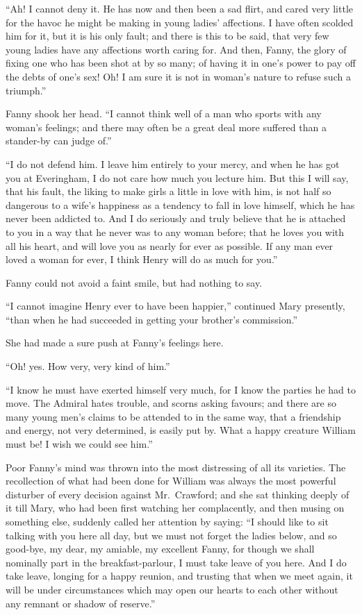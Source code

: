 \documentclass{article}
\begin{document}
``Ah!  I cannot deny it.  He has now and then been a sad flirt,
and cared very little for the havoc he might be making in
young ladies' affections.  I have often scolded him for it,
but it is his only fault; and there is this to be said,
that very few young ladies have any affections worth
caring for.  And then, Fanny, the glory of fixing one
who has been shot at by so many; of having it in one's
power to pay off the debts of one's sex!  Oh!  I am sure
it is not in woman's nature to refuse such a triumph.''

Fanny shook her head.  ``I cannot think well of a man
who sports with any woman's feelings; and there may often
be a great deal more suffered than a stander-by can judge of.''

``I do not defend him.  I leave him entirely to your mercy,
and when he has got you at Everingham, I do not care how much
you lecture him.  But this I will say, that his fault,
the liking to make girls a little in love with him, is not
half so dangerous to a wife's happiness as a tendency to fall
in love himself, which he has never been addicted to.
And I do seriously and truly believe that he is attached
to you in a way that he never was to any woman before;
that he loves you with all his heart, and will love you
as nearly for ever as possible.  If any man ever loved
a woman for ever, I think Henry will do as much for you.''

Fanny could not avoid a faint smile, but had nothing
to say.

``I cannot imagine Henry ever to have been happier,''
continued Mary presently, ``than when he had succeeded
in getting your brother's commission.''

She had made a sure push at Fanny's feelings here.

``Oh! yes.  How very, very kind of him.''

``I know he must have exerted himself very much, for I know
the parties he had to move.  The Admiral hates trouble,
and scorns asking favours; and there are so many
young men's claims to be attended to in the same way,
that a friendship and energy, not very determined,
is easily put by.  What a happy creature William must be!
I wish we could see him.''

Poor Fanny's mind was thrown into the most distressing
of all its varieties.  The recollection of what had
been done for William was always the most powerful
disturber of every decision against Mr.\ Crawford;
and she sat thinking deeply of it till Mary, who had been
first watching her complacently, and then musing on
something else, suddenly called her attention by saying:
``I should like to sit talking with you here all day,
but we must not forget the ladies below, and so good-bye,
my dear, my amiable, my excellent Fanny, for though we
shall nominally part in the breakfast-parlour, I must
take leave of you here.  And I do take leave, longing for
a happy reunion, and trusting that when we meet again,
it will be under circumstances which may open our hearts
to each other without any remnant or shadow of reserve.''
\end{document}
